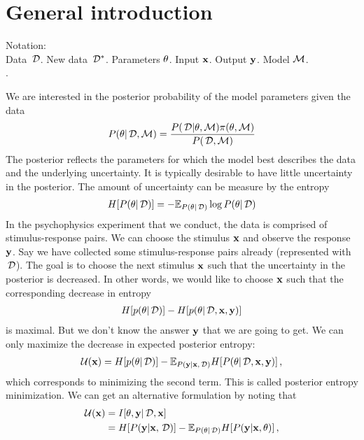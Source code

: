 
\section*{General introduction} %
\label{sec:general_introduction}
Notation: \\
Data $\,\mathcal{D}$. New data $\,\mathcal{D}^*$. Parameters $\theta$. Input ${\bf x}$. Output ${\bf y}$. Model $\mathcal{M}$. \\
.

We are interested in the posterior probability of the model parameters given the data
\begin{align}\label{eq:posterior}
	{P(\theta| \,\mathcal{D}, \mathcal{M})} = \frac{{P(\,\mathcal{D} | \theta, \mathcal{M})} {\pi(\theta, \mathcal{M})}}{{P(\,\mathcal{D}, \mathcal{M})}}
\end{align}
The posterior reflects the parameters for which the model best describes the data and the underlying uncertainty. It is typically desirable to have little uncertainty in the posterior. The amount of uncertainty can be measure by the entropy
\begin{align}
	H[{P(\theta | \,\mathcal{D})}] =
	- \mathbb{E}_{{P(\theta | \,\mathcal{D})}} \log{P(\theta| \,\mathcal{D})}
\end{align}
In the psychophysics experiment that we conduct, the data is comprised of stimulus-response pairs. We can choose the stimulus ${\bf x}$ and observe the response ${\bf y}$. Say we have collected some stimulus-response pairs already (represented with $\,\mathcal{D}$). The goal is to choose the next stimulus ${\bf x}$ such that the uncertainty in the posterior is decreased. In other words, we would like to choose ${\bf x}$ such that the corresponding decrease in entropy
\begin{align}
	H[p(\theta | \,\mathcal{D})] - H[p(\theta | \,\mathcal{D}, {\bf x}, {\bf y})]
\end{align}
is maximal. But we don't know the answer ${\bf y}$ that we are going to get. We can only maximize the decrease in expected posterior entropy:
\begin{align}
	\mathcal{U}({\bf x})
	= H[p(\theta | \,\mathcal{D})]
	- \mathbb{E}_{{P({\bf y} | {\bf x}, \,\mathcal{D})}} H[{P(\theta | \,\mathcal{D}, {\bf x}, {\bf y})}] \,,
\end{align}
which corresponds to minimizing the second term. This is called posterior entropy minimization.
We can get an alternative formulation by noting that
\begin{align}
	\mathcal{U}({\bf x})
	&= I[\theta, {\bf y} | \,\mathcal{D}, {\bf x}] \\
	&= H[{P({\bf y} | {\bf x}, \,\mathcal{D})}]
	- \mathbb{E}_{{P(\theta | \,\mathcal{D})}} H[{P({\bf y} | {\bf x}, \theta)}] \,,
\end{align}
